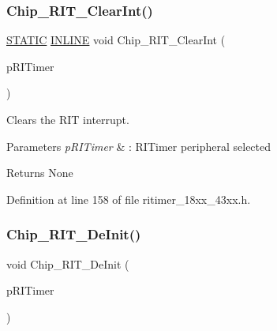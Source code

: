 \subsubsection{\texorpdfstring{Chip\+\_\+\+R\+I\+T\+\_\+\+Clear\+Int()}{Chip\_RIT\_ClearInt()}}
{\footnotesize\ttfamily \hyperlink{group___l_p_c___types___public___macros_ga10b2d890d871e1489bb02b7e70d9bdfb}{S\+T\+A\+T\+IC} \hyperlink{spifi__18xx__43xx_8h_a2eb6f9e0395b47b8d5e3eeae4fe0c116}{I\+N\+L\+I\+NE} void Chip\+\_\+\+R\+I\+T\+\_\+\+Clear\+Int (\begin{DoxyParamCaption}\item[{\hyperlink{struct_l_p_c___r_i_t_i_m_e_r___t}{L\+P\+C\+\_\+\+R\+I\+T\+I\+M\+E\+R\+\_\+T} $\ast$}]{p\+R\+I\+Timer }\end{DoxyParamCaption})}



Clears the R\+IT interrupt. 


\begin{DoxyParams}{Parameters}
{\em p\+R\+I\+Timer} & \+: R\+I\+Timer peripheral selected \\
\hline
\end{DoxyParams}
\begin{DoxyReturn}{Returns}
None 
\end{DoxyReturn}


Definition at line 158 of file ritimer\+\_\+18xx\+\_\+43xx.\+h.

\mbox{\label{group___r_i_t_i_m_e_r__18_x_x__43_x_x_ga31be6db37bc84b88664bd37e537bb881}} 
\subsubsection{\texorpdfstring{Chip\+\_\+\+R\+I\+T\+\_\+\+De\+Init()}{Chip\_RIT\_DeInit()}}
{\footnotesize\ttfamily void Chip\+\_\+\+R\+I\+T\+\_\+\+De\+Init (\begin{DoxyParamCaption}\item[{\hyperlink{struct_l_p_c___r_i_t_i_m_e_r___t}{L\+P\+C\+\_\+\+R\+I\+T\+I\+M\+E\+R\+\_\+T} $\ast$}]{p\+R\+I\+Timer }\end{DoxyParamCaption})}



